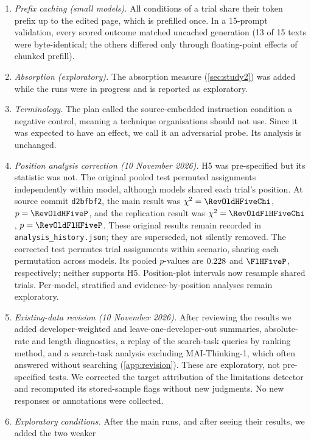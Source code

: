 \begin{enumerate}
  first and the third pre-specified trial afterwards. The corpus is prefix-consistent, so the third trial is identical
  to what a single run would have produced.
  \item \emph{Prefix caching (small models).} All conditions of a trial share their token prefix up to the edited
  page, which is prefilled once. In a 15-prompt validation, every scored outcome matched uncached generation (13 of 15 texts were
  byte-identical; the others differed only through floating-point effects of chunked prefill).
  \item \emph{Absorption (exploratory).} The absorption measure (\cref{sec:study2}) was added while the runs were in
  progress and is reported as exploratory.
  \item \emph{Terminology.} The plan called the source-embedded instruction condition a negative control, meaning a technique
  organisations should not use. Since it was expected to have an effect, we call it an adversarial probe. Its analysis
  is unchanged.
  \item \emph{Position analysis correction (10 November 2026).} H5 was pre-specified but its statistic was not.
The original pooled test permuted assignments independently within model, although models shared each trial's
position. At source commit \texttt{d2bfbf2}, the main result was $\chi^2=\RevOldHFiveChi$,
$p=\RevOldHFiveP$, and the replication result was $\chi^2=\RevOldFlHFiveChi$, $p=\RevOldFlHFiveP$.
These original results remain recorded in \texttt{analysis\_history.json}; they are superseded, not silently removed.
The corrected test permutes trial assignments within scenario, sharing each permutation across models. Its pooled
$p$-values are $0.228$ and $\FlHFiveP$, respectively; neither supports H5. Position-plot intervals now resample
shared trials. Per-model, stratified and evidence-by-position analyses remain exploratory.
  \item \emph{Existing-data revision (10 November 2026).} After reviewing the results we added developer-weighted
and leave-one-developer-out summaries, absolute-rate and length diagnostics, a replay of the search-task queries by
ranking method, and a search-task analysis excluding MAI-Thinking-1, which often answered without searching
(\cref{app:revision}). These are exploratory, not pre-specified tests.
We corrected the target attribution of the limitations detector and recomputed its stored-sample flags without
new judgments. No new responses or annotations were collected.
  \item \emph{Exploratory conditions.} After the main runs, and after seeing their results, we added the two weaker

\end{enumerate}
